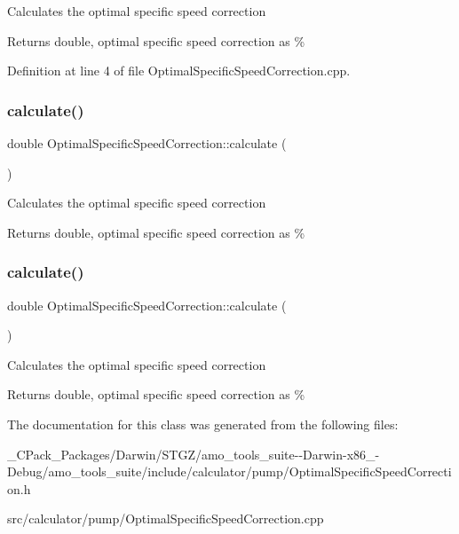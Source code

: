 Calculates the optimal specific speed correction \begin{DoxyReturn}{Returns}
double, optimal specific speed correction as \% 
\end{DoxyReturn}


Definition at line 4 of file Optimal\+Specific\+Speed\+Correction.\+cpp.

\mbox{\label{class_optimal_specific_speed_correction_a3337ebde4e64c20f19adbda6204fa0be}} 
\subsubsection{\texorpdfstring{calculate()}{calculate()}\hspace{0.1cm}{\footnotesize\ttfamily [2/3]}}
{\footnotesize\ttfamily double Optimal\+Specific\+Speed\+Correction\+::calculate (\begin{DoxyParamCaption}{ }\end{DoxyParamCaption})}

Calculates the optimal specific speed correction \begin{DoxyReturn}{Returns}
double, optimal specific speed correction as \% 
\end{DoxyReturn}
\mbox{\label{class_optimal_specific_speed_correction_a3337ebde4e64c20f19adbda6204fa0be}} 
\subsubsection{\texorpdfstring{calculate()}{calculate()}\hspace{0.1cm}{\footnotesize\ttfamily [3/3]}}
{\footnotesize\ttfamily double Optimal\+Specific\+Speed\+Correction\+::calculate (\begin{DoxyParamCaption}{ }\end{DoxyParamCaption})}

Calculates the optimal specific speed correction \begin{DoxyReturn}{Returns}
double, optimal specific speed correction as \% 
\end{DoxyReturn}


The documentation for this class was generated from the following files\+:\begin{DoxyCompactItemize}
\item 
\+\_\+\+C\+Pack\+\_\+\+Packages/\+Darwin/\+S\+T\+G\+Z/amo\+\_\+tools\+\_\+suite-\/-\/\+Darwin-\/x86\+\_-\/\+Debug/amo\+\_\+tools\+\_\+suite/include/calculator/pump/Optimal\+Specific\+Speed\+Correction.\+h\item 
src/calculator/pump/Optimal\+Specific\+Speed\+Correction.\+cpp\end{DoxyCompactItemize}
